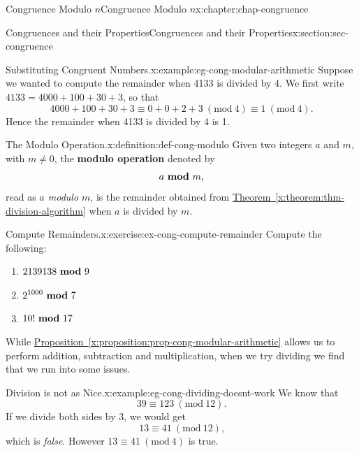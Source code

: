 \documentclass[oneside,10pt,]{book}
\newcommand{\xreffont}{\relax}
\newcommand{\terminology}[1]{\textbf{#1}}
\numberwithin{equation}{section}
\newcommand{\Mod}[1]{\ \left(\mathrm{mod}\ #1\right)}
\newcommand{\mmod}[1]{\ \mathrm{\bf mod}\ #1}
\begin{document}
\begin{chapterptx}{Congruence Modulo \(n\)}{}{Congruence Modulo \(n\)}{}{}{x:chapter:chap-congruence}
\begin{sectionptx}{Congruences and their Properties}{}{Congruences and their Properties}{}{}{x:section:sec-congruence}
\begin{example}{Substituting Congruent Numbers.}{x:example:eg-cong-modular-arithmetic}%
Suppose we wanted to compute the remainder when 4133 is divided by 4. We first write \(4133 = 4000 + 100 + 30 + 3\), so that%
\begin{equation*}
4000 + 100 + 30 + 3 \equiv 0 + 0 + 2 + 3 \Mod{4} \equiv 1 \Mod{4}\text{.}
\end{equation*}
Hence the remainder when 4133 is divided by 4 is 1.%
\end{example}
\begin{definition}{The Modulo Operation.}{x:definition:def-cong-modulo}%
Given two integers \(a\) and \(m\), with \(m \ne 0\), the \terminology{modulo operation} denoted by%
\begin{equation*}
a \mmod{m}\text{,}
\end{equation*}
read as \emph{\(a\) modulo \(m\)}, is the remainder obtained from \hyperref[x:theorem:thm-division-algorithm]{Theorem~{\xreffont\ref{x:theorem:thm-division-algorithm}}} when \(a\) is divided by \(m\). \label{g:notation:id537880}%
\end{definition}
\begin{inlineexercise}{Compute Remainders.}{x:exercise:ex-cong-compute-remainder}%
Compute the following:%
\begin{enumerate}[label=(\alph*)]
\item{}\(\displaystyle 2139138 \mmod 9\)%
\item{}\(\displaystyle 2^{1000} \mmod 7\)%
\item{}\(\displaystyle 10! \mmod 17\)%
\end{enumerate}
%
\end{inlineexercise}%
While \hyperref[x:proposition:prop-cong-modular-arithmetic]{Proposition~{\xreffont\ref{x:proposition:prop-cong-modular-arithmetic}}} allows us to perform addition, subtraction and multiplication, when we try dividing we find that we run into some issues.%
\begin{example}{Division is not as Nice.}{x:example:eg-cong-dividing-doesnt-work}%
We know that%
\begin{equation*}
39 \equiv 123 \Mod{12}\text{.}
\end{equation*}
If we divide both sides by 3, we would get%
\begin{equation*}
13 \equiv 41 \Mod{12}\text{,}
\end{equation*}
which is \emph{false}. However \(13 \equiv 41 \Mod{4}\) is true.%
\end{example}

\end{sectionptx}
\end{chapterptx}
\end{document}
